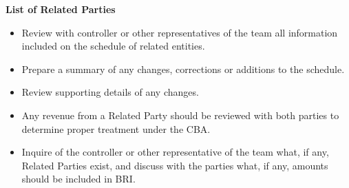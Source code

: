 \documentclass[
]{book}
\providecommand{\tightlist}{%
  \setlength{\itemsep}{0pt}\setlength{\parskip}{0pt}}
\begin{document}
\textbf{List of Related Parties}

\begin{itemize}
\tightlist
\item
  Review with controller or other representatives of the team all information included on the schedule of related entities.
\item
  Prepare a summary of any changes, corrections or additions to the schedule.
\item
  Review supporting details of any changes.
\item
  Any revenue from a Related Party should be reviewed with both parties to determine proper treatment under the CBA.
\item
  Inquire of the controller or other representative of the team what, if any, Related Parties exist, and discuss with the parties what, if any, amounts should be included in BRI.
\end{itemize}
\end{document}
